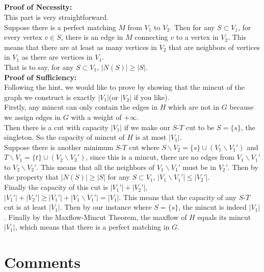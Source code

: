 \documentclass[12pt,letterpaper]{article}
\begin{document}
\subsection{}
\textbf{Proof of Necessity:}\\
This part is very straightforward.\\
Suppose there is a perfect matching $M$ from $V_1$ to $V_2$.
Then for any $S\subset V_1$, 
for every vertex $v\in S$,
there is an edge in $M$ connecting $v$ to a vertex in $V_2$.
This means that there are at least as many vertices in $V_2$ that are neighbors of vertices in $V_1$
as there are vertices in $V_1$.\\
That is to say, for any $S\subset V_1$,
$|N(S)|\geq|S|$.\\
\textbf{Proof of Sufficiency:}\\
Following the hint, we would like to prove by showing that the mincut 
of the graph we construct is exactly $|V_1|$(or $|V_2|$ if you like).\\
Firstly, any mincut can only contain the edges in $H$ which are not in $G$
because we assign edges in $G$ with a weight of $+\infty$.\\
Then there is a cut with capacity $|V_1|$ 
if we make our $S$-$T$ cut to be $S=\{s\}$, the singleton.
So the capacity of mincut of $H$ is at most $|V_1|$.\\
Suppose there is another minimum $S$-$T$ cut where $S\backslash V_2=\{s\}\cup (V_1\backslash V_1')$
and $T\backslash V_1=\{t\}\cup (V_2\backslash V_2')$,
since this is a mincut, 
there are no edges from $V_1\backslash V_1'$ to $V_2\backslash V_2'$.
This means that all the neighbors of $V_1\backslash V_1'$ must be in $V_2'$.
Then by the property that $|N(S)|\geq |S|$ for any $S\subset V_1$,
$|V_1\backslash V_1'|\leq |V_2'|$.\\
Finally the capacity of this cut is $|V_1'|+|V_2'|$,
$|V_1'|+|V_2'|\geq |V_1'|+|V_1\backslash V_1'|=|V_1|$.
This means that the capacity of any $S$-$T$ cut is at least $|V_1|$.
Then by our instance where $S=\{s\}$, the mincut is indeed $|V_1|$.
Finally by the Maxflow-Mincut Theorem, 
the maxflow of $H$ equals its mincut $|V_1|$,
which means that there is a perfect matching in $G$.
 
\newpage
\section{}



\newpage
\section{Comments}
\subsection{}

\subsection{}

\subsection{}
\end{document}
